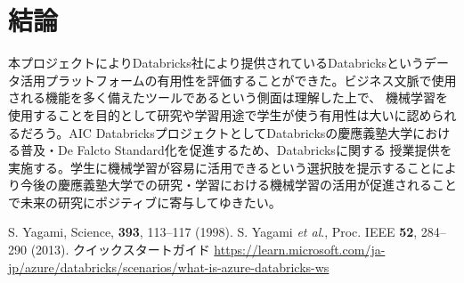 \documentclass[twocolumn]{jsarticle}
\begin{document}
\section{結論}
本プロジェクトによりDatabricks社により提供されているDatabricksというデータ活用プラットフォームの有用性を評価することができた。ビジネス文脈で使用される機能を多く備えたツールであるという側面は理解した上で、
機械学習を使用することを目的として研究や学習用途で学生が使う有用性は大いに認められるだろう。AIC DatabricksプロジェクトとしてDatabricksの慶應義塾大学における普及・De Falcto Standard化を促進するため、Databricksに関する
授業提供を実施する。学生に機械学習が容易に活用できるという選択肢を提示することにより今後の慶應義塾大学での研究・学習における機械学習の活用が促進されることで未来の研究にポジティブに寄与してゆきたい。

\begin{thebibliography}{9}
   S. Yagami, Science, \textbf{393}, 113--117 (1998).
   S. Yagami \textit{et al}., Proc. IEEE \textbf{52}, 284--290 (2013).
    クイックスタートガイド
   \url{https://learn.microsoft.com/ja-jp/azure/databricks/scenarios/what-is-azure-databricks-ws}
  \bibitem{}
  \end{thebibliography}
\end{document}
